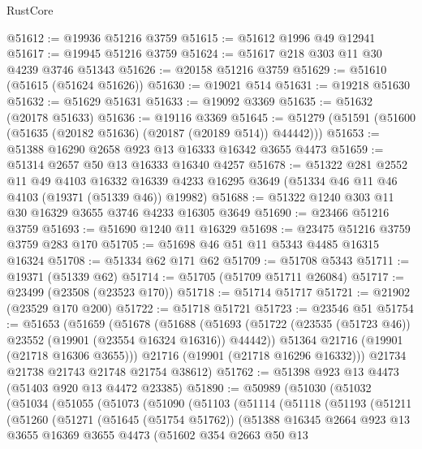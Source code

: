 \begin{lexlean}{RustCore}
\begin{coremodule}
@51612 := @19936 @51216 @3759
@51615 := @51612 @1996 @49 @12941
@51617 := @19945 @51216 @3759
@51624 := @51617 @218 @303 @11 @30 @4239 @3746 @51343
@51626 := @20158 @51216 @3759
@51629 := @51610 (@51615 (@51624 @51626))
@51630 := @19021 @514
@51631 := @19218 @51630
@51632 := @51629 @51631
@51633 := @19092 @3369
@51635 := @51632 (@20178 @51633)
@51636 := @19116 @3369
@51645 := @51279 (@51591 (@51600 (@51635 (@20182 @51636) (@20187 (@20189 @514)) @44442)))
@51653 := @51388 @16290 @2658 @923 @13 @16333 @16342 @3655 @4473
@51659 := @51314 @2657 @50 @13 @16333 @16340 @4257
@51678 := @51322
    @281
    @2552
    @11
    @49
    @4103
    @16332
    @16339
    @4233
    @16295
    @3649
    (@51334 @46 @11 @46 @4103 (@19371 (@51339 @46)) @19982)
@51688 := @51322 @1240 @303 @11 @30 @16329 @3655 @3746 @4233 @16305 @3649
@51690 := @23466 @51216 @3759
@51693 := @51690 @1240 @11 @16329
@51698 := @23475 @51216 @3759 @3759 @283 @170
@51705 := @51698 @46 @51 @11 @5343 @4485 @16315 @16324
@51708 := @51334 @62 @171 @62
@51709 := @51708 @5343
@51711 := @19371 (@51339 @62)
@51714 := @51705 (@51709 @51711 @26084)
@51717 := @23499 (@23508 (@23523 @170))
@51718 := @51714 @51717
@51721 := @21902 (@23529 @170 @200)
@51722 := @51718 @51721
@51723 := @23546 @51
@51754 := @51653
    (@51659
      (@51678
        (@51688
          (@51693 (@51722 (@23535 (@51723 @46)) @23552 (@19901 (@23554 @16324 @16316)) @44442))
          @51364
          @21716
          (@19901 (@21718 @16306 @3655)))
        @21716
        (@19901 (@21718 @16296 @16332)))
      @21734
      @21738
      @21743
      @21748
      @21754
      @38612)
@51762 := @51398 @923 @13 @4473 (@51403 @920 @13 @4472 @23385)
@51890 := @50989
    (@51030
      (@51032
        (@51034
          (@51055
            (@51073
              (@51090
                (@51103
                  (@51114
                    (@51118
                      (@51193
                        (@51211
                          (@51260
                            (@51271
                              (@51645 (@51754 @51762))
                              (@51388
                                @16345
                                @2664
                                @923
                                @13
                                @3655
                                @16369
                                @3655
                                @4473
                                (@51602
                                  @354
                                  @2663
                                  @50
                                  @13

\end{coremodule}
\end{lexlean}
